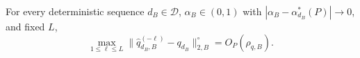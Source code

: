 For every deterministic sequence \(d_B\in\mathcal D\), \(\alpha_B\in(0,1)\) with \(|\alpha_B-\alpha_{d_B}^*(P)|\to0\), and fixed \(L\),
\[
\max_{1\le\ell\le L}\|\widehat q_{d_B,B}^{(-\ell)}-q_{d_B}\|_{2,B}^{\circ}=O_P(\rho_{q,B}).
\]